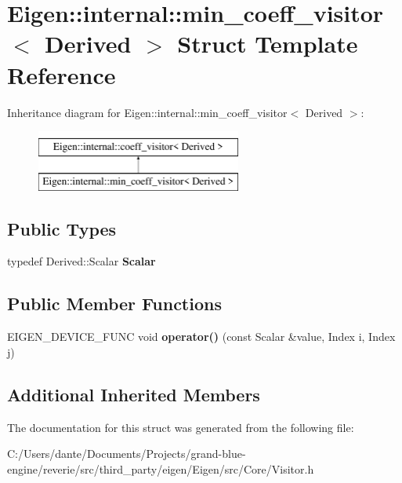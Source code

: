 \hypertarget{struct_eigen_1_1internal_1_1min__coeff__visitor}{}\section{Eigen\+::internal\+::min\+\_\+coeff\+\_\+visitor$<$ Derived $>$ Struct Template Reference}
\label{struct_eigen_1_1internal_1_1min__coeff__visitor}
Inheritance diagram for Eigen\+::internal\+::min\+\_\+coeff\+\_\+visitor$<$ Derived $>$\+:\begin{figure}[H]
\begin{center}
\leavevmode
\includegraphics[height=2.000000cm]{struct_eigen_1_1internal_1_1min__coeff__visitor}
\end{center}
\end{figure}
\subsection*{Public Types}
\begin{DoxyCompactItemize}
\item 
\mbox{\label{struct_eigen_1_1internal_1_1min__coeff__visitor_a03daf8994ba68bd00977f86ba0c6ecfd}} 
typedef Derived\+::\+Scalar {\bfseries Scalar}
\end{DoxyCompactItemize}
\subsection*{Public Member Functions}
\begin{DoxyCompactItemize}
\item 
\mbox{\label{struct_eigen_1_1internal_1_1min__coeff__visitor_a5bbabda415cc8cabce947bf31f9456a4}} 
E\+I\+G\+E\+N\+\_\+\+D\+E\+V\+I\+C\+E\+\_\+\+F\+U\+NC void {\bfseries operator()} (const Scalar \&value, Index i, Index j)
\end{DoxyCompactItemize}
\subsection*{Additional Inherited Members}


The documentation for this struct was generated from the following file\+:\begin{DoxyCompactItemize}
\item 
C\+:/\+Users/dante/\+Documents/\+Projects/grand-\/blue-\/engine/reverie/src/third\+\_\+party/eigen/\+Eigen/src/\+Core/Visitor.\+h\end{DoxyCompactItemize}
